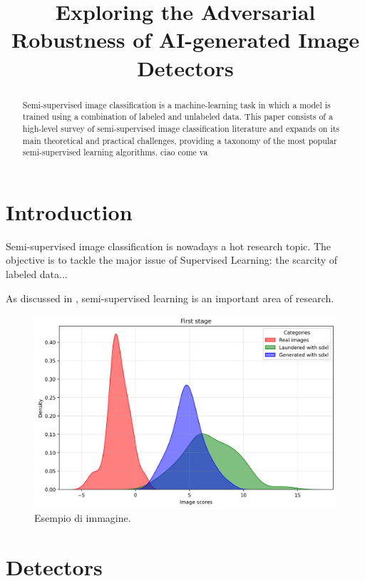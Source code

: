 \documentclass[conference]{IEEEtran} %
\begin{document}
\title{Exploring the Adversarial Robustness of AI-generated Image Detectors}

\author{
}

\maketitle

\begin{abstract}
Semi-supervised image classification is a machine-learning task in which a model is trained using a combination of labeled and unlabeled data. This paper consists of a high-level survey of semi-supervised image classification literature and expands on its main theoretical and practical challenges, providing a taxonomy of the most popular semi-supervised learning algorithms. ciao come va
\end{abstract}

\section{Introduction}
Semi-supervised image classification is nowadays a hot research topic. The objective is to tackle the major issue of Supervised Learning: the scarcity of labeled data...

As discussed in \cite{corvi2023detection}, semi-supervised learning is an important area of research.

\begin{figure}[h]
    \centering
    \includegraphics[width=0.8\linewidth]{Img/First_stage.png}
    \caption{Esempio di immagine.}
    \label{fig:esempio}
\end{figure}


\section{Detectors}
\end{document}

